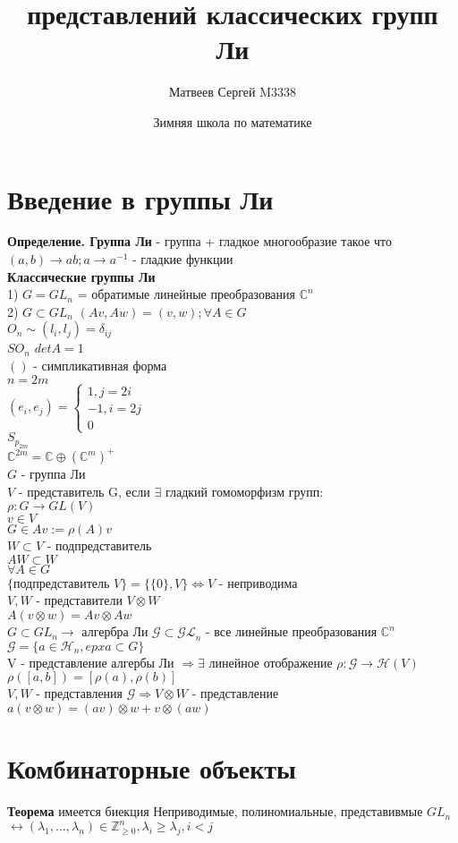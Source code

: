 \documentclass{article}
\title{\hugeКомбинаторика представлений классических групп Ли}
\author{Матвеев Сергей M3338}
\date{Зимняя школа по математике}
\newcommand\0{\mathbb{0}}
\newcommand\1{\mathbb{1}}
\renewcommand{\bf}{\textbf}
\newcommand{\lrto}{\leftrightarrow}
\newcommand{\Rto}{\Rightarrow}
\newcommand{\LRto}{\Leftrightarrow}
\begin{document}
\maketitle
\section{Введение в группы Ли}
\bf{Определение. Группа Ли} - группа + гладкое многообразие такое что $(a, b) \to ab; a \to a^{-1}$ - гладкие функции\\
\bf{Классические группы Ли}\\
1) $G = GL_n$ = обратимые линейные преобразования $\mathbb{C}^n$\\
2) $G \subset GL_n$ $(Av, Aw) = (v, w); \forall A \in G$\\
$O_n \sim (l_i, l_j) = \delta_{ij}$\\
$SO_n$  $detA = 1$\\
$()$ - симпликативная форма\\
$n = 2m$\\
$(e_i, e_j) = \begin{cases}
    1, j = 2i\\
    -1, i = 2j\\
    0
\end{cases}$\\
$S_{p_{2m}}$\\
$\mathbb{C}^{2m} = \mathbb{C} \oplus (\mathbb{C}^m)^+$\\
$G$ - группа Ли\\
$V$ - представитель G, если $\exists$ гладкий гомоморфизм групп:\\
$\rho: G \to GL(V)$\\
$v \in V$\\
$G \in Av := \rho(A)v$\\
$W \subset V$ - подпредставитель\\
$AW \subset W$\\
$\forall A \in G$\\
$\{\text{подпредставитель } V\} = \{\{0\}, V\} \LRto V$ - неприводима\\
$V, W$ - представители $V \otimes W$\\
$A(v \otimes w) = Av \otimes Aw$\\
$G \subset GL_n \to $ алгербра Ли $\mathcal{G} \subset \mathcal{GL}_n$ - все линейные преобразования $\mathbb{C}^n$\\
$\mathcal{G} = \{a \in  \mathcal{H}_n, epxa \subset G\}$\\
V - представление алгербы Ли $\Rto \exists$ линейное отображение $\rho: \mathcal{G} \to \mathcal{H}(V)$\\
$\rho([a, b]) = [\rho(a), \rho(b)]$\\
$V, W$ - представления $\mathcal{G} \Rto V \otimes W$ - представление\\
$a(v \otimes w) = (av) \otimes w + v \otimes (aw)$\\
\section{Комбинаторные объекты}
\bf{Теорема} имеется биекция Неприводимые, полиномиальные, представивмые $GL_n$ $\lrto (\lambda_1, \dots, \lambda_n) \in \mathbb{Z}^n_{\geq 0}, \lambda_i \geq \lambda_j, i < j$\\
\end{document}
